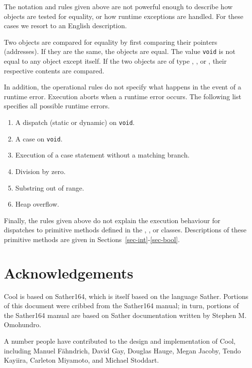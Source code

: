 The notation and rules given above are not powerful enough to
describe how objects are tested for equality, or how runtime
exceptions are handled.  For these cases we resort to an
English description.

Two objects are compared for equality by first comparing their
pointers (addresses). If they are the same, the objects are equal. 
The value {\tt void} is not equal to any object except itself.  
If the two objects are of type , , or , their respective
contents are compared.

In addition, the operational rules do not specify what happens in the
event of a runtime error.  Execution aborts when a runtime error
occurs. The following list specifies all possible runtime errors.
\begin{enumerate}
\item A dispatch (static or dynamic) on {\tt void}.
\item A case on {\tt void}.
\item Execution of a case statement without a matching branch.
\item Division by zero.
\item Substring out of range.
\item Heap overflow.

\end{enumerate}


Finally, the rules given above do not
explain the execution behaviour for dispatches to primitive methods defined in
the , , or  classes.
Descriptions of these primitive methods are given in Sections~\ref{sec-int}-\ref{sec-bool}.

\section{Acknowledgements}

Cool is based on Sather164, which is itself based on the language
Sather.  Portions of this document were cribbed from the Sather164
manual; in turn, portions of the Sather164 manual are based on Sather
documentation written by Stephen M. Omohundro.

A number people have contributed to the design and implementation of
Cool, including Manuel F\"{a}hndrich, David Gay, Douglas Hauge,
 Megan Jacoby, Tendo Kayiira, Carleton Miyamoto, and Michael Stoddart.


